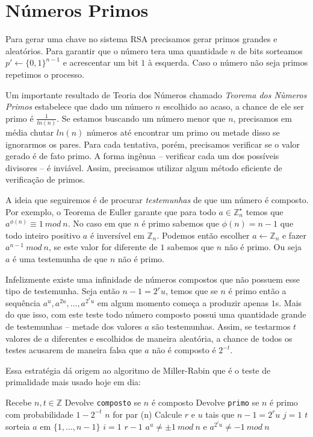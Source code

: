 \chapter{Números Primos}
\label{cha:primos}

Para gerar uma chave no sistema RSA precisamos gerar primos grandes e aleatórios.
Para garantir que o número tera uma quantidade $n$ de bits sorteamos $p' \leftarrow \{0,1\}^{n-1}$ e acrescentar um bit $1$ à esquerda.
Caso o número não seja primos repetimos o processo.

Um importante resultado de Teoria dos Números chamado {\em Teorema dos Nùmeros Primos} estabelece que dado um número $n$ escolhido ao acaso, a chance de ele ser primo é $\frac{1}{ln(n)}$.
Se estamos buscando um número menor que $n$, precisamos em média chutar $ln(n)$ números até encontrar um primo ou metade disso se ignorarmos os pares.
Para cada tentativa, porém, precisamos verificar se o valor gerado é de fato primo.
A forma ingênua -- verificar cada um dos possíveis divisores -- é inviável.
Assim, precisamos utilizar algum método eficiente de verificação de primos.

A ideia que seguiremos é de procurar {\em testemunhas} de que um número é composto.
Por exemplo, o Teorema de Euller garante que para todo $a \in \mathbb{Z}_n^\star$ temos que $a^{\phi(n)} \equiv 1\ mod\ n$.
No caso em que $n$ é primo sabemos que $\phi(n) = n - 1$ que todo inteiro positivo $a$ é inversível em $\mathbb{Z}_n$.
Podemos então escolher $a \leftarrow \mathbb{Z}_n$ e fazer $a^{n-1}\ mod\ n$, se este valor for diferente de $1$ sabemos que $n$ não é primo.
Ou seja $a$ é uma testemunha de que $n$ não é primo.

Infelizmente existe uma infinidade de números compostos que não possuem esse tipo de testemunha.
Seja então $n - 1 = 2^ru$, temos que se $n$ é primo então a sequência $a^u, a^{2u}, \dots, a^{2^ru}$ em algum momento começa a produzir apenas $1$s.
Mais do que isso, com este teste todo número composto possui uma quantidade grande de testemunhas -- metade dos valores $a$ são testemunhas.
Assim, se testarmos $t$ valores de $a$ diferentes e escolhidos de maneira aleatória, a chance de todos os testes acusarem de maneira falsa que $a$ não é composto é $2^{-t}$.

Essa estratégia dá origem ao algoritmo de Miller-Rabin \cite{Miller75,Rabin80} que é o teste de primalidade mais usado hoje em dia:

\begin{codebox}
\li \Comment Recebe $n, t \in \mathbb{Z}$
\li \Comment Devolve {\tt composto} se $n$ é composto
\li \Comment Devolve {\tt primo} se $n$ é primo com probabilidade $1 - 2^{-t}$
\li \If $n$ for par
\li   \Then {}
    \End
\li \If {}(n)
\li   \Then {}
    \End
\li  Calcule $r$ e $u$ tais que $n-1 = 2^ru$
\li \For $j = 1$ \To $t$
\li   \Do sorteia $a$ em $\{1, \dots, n-1\}$ 
\li   \For $i = 1$ \To $r-1$
\li     \Do \If $a^u \neq \pm 1\ mod\ n$ e $a^{2^iu} \neq -1\ mod\ n$
\li         \Then {}
            \End
      \End
    \End
\li {}
\end{codebox}

